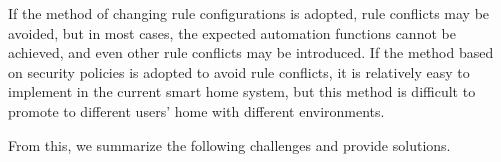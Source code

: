 If the method of changing rule configurations is adopted, rule conflicts may be avoided, but in most cases, the expected automation functions cannot be achieved, and even other rule conflicts may be introduced. If the method based on security policies is adopted to avoid rule conflicts, it is relatively easy to implement in the current smart home system, but this method is difficult to promote to different users' home with different environments.

From this, we summarize the following challenges and provide solutions.








